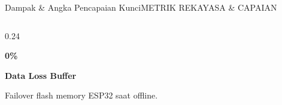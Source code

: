 \documentclass[aspectratio=169,11pt]{beamer}
\begin{document}
\begin{frame}{Dampak \& Angka Pencapaian Kunci}{METRIK REKAYASA \& CAPAIAN}
\begin{columns}[t]
    \begin{column}{0.24\textwidth}
      \begin{tcolorbox}[colback=brandCardBg,colframe=brandBorder,arc=2mm,boxrule=0.6pt,halign=center,boxsep=3pt,top=5pt,bottom=5pt]
        {\LARGE \bfseries \color{brandNavy} 0\%} \par \vspace{2pt}
        {\scriptsize \bfseries \color{brandBlue} Data Loss Buffer} \par \vspace{2pt}
        {\tiny \color{brandSlate} Failover flash memory ESP32 saat offline.}
      \end{tcolorbox}
    \end{column}
  \end{columns}
\end{frame}
\end{document}
